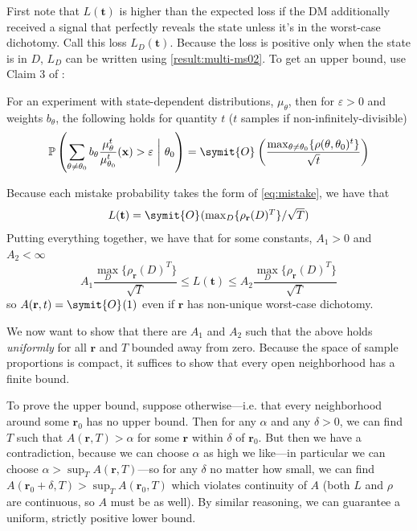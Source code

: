 \documentclass{fancyArticle}
\renewcommand{\|}{\,|\,}                    %
\providecommand{\;}{\,;}                    %
\renewcommand{\O}{\symit{O}\:\!}            %
\begin{document}
\begin{appendix}
  First note that $L(\mathbf{t})$ is higher than the expected loss if the DM additionally received a signal that perfectly reveals the state unless it's in the worst-case dichotomy.
  Call this loss $L_{D}(\mathbf{t})$.
  Because the loss is positive only when the state is in $D$, $L_{D}$ can be written using \autoref{result:multi-ms02}.
  To get an upper bound, use Claim 3 of \cite[p. 2363]{Moscarini2002}:
  \begin{lemma*}
    For an experiment with state-dependent distributions, $\mu_{\theta}$, then for $\varepsilon>0$ and weights $b_{\theta}$, the following holds for quantity $t$ ($t$ samples if non-infinitely-divisible)
    \begin{equation}
      \label{eq:mistake}
      \mathbb{P}\left(\sum_{\theta\neq\theta_0}b_{\theta}
        \frac{\mu_{\theta}^t}{\mu_{\theta_0}^t}(\mathbf{x})>\varepsilon\ \bigg|\ \theta_0 \right)
      = \O \left( \frac{\textstyle\max_{\theta\neq\theta_0}\{\rho(\theta,\theta_{0})^{t}\}}{\sqrt{t}} \right)
    \end{equation}
  \end{lemma*}
  Because each mistake probability takes the form of \ref{eq:mistake}, we have that
  \begin{equation*}
    L(\mathbf{t})=\O(\textstyle\max_D\{\rho_{\mathbf{r}}(D)^T\}/\sqrt{T})
  \end{equation*}
  Putting everything together, we have that for some constants, $A_1>0$ and $A_2<\infty$
  \begin{equation*}
    A_1 \frac{\textstyle\max_D \{\rho_{\mathbf{r}}(D)^T\}}{\sqrt{T}}
    \leq
    L(\mathbf{t})
    \leq
    A_2 \frac{\textstyle\max_D \{\rho_{\mathbf{r}}(D)^T\}}{\sqrt{T}}
  \end{equation*}
  so $A(\mathbf{r},t)=\O(1)$ even if $\mathbf{r}$ has non-unique worst-case dichotomy.

  We now want to show that there are $A_1$ and $A_2$ such that the above holds \textit{uniformly} for all $\mathbf{r}$ and $T$ bounded away from zero.
  Because the space of sample proportions is compact, it suffices to show that every open neighborhood has a finite bound.

  To prove the upper bound, suppose otherwise---i.e. that every neighborhood around some $\mathbf{r}_{0}$ has no upper bound.
  Then for any $\alpha$ and any $\delta>0$, we can find $T$ such that $A(\mathbf{r},T)>\alpha$ for some $\mathbf{r}$ within $\delta$ of $\mathbf{r}_{0}$.
  But then we have a contradiction, because we can choose $\alpha$ as high we like---in particular we can choose $\alpha>\sup_T A(\mathbf{r},T)$---so for any $\delta$ no matter how small, we can find $A(\mathbf{r}_{0}+\delta,T)>\sup_T A(\mathbf{r}_{0},T)$ which violates continuity of $A$ (both $L$ and $\rho$ are continuous, so $A$ must be as well).
  By similar reasoning, we can guarantee a uniform, strictly positive lower bound.\\


\end{appendix}
\end{document}
